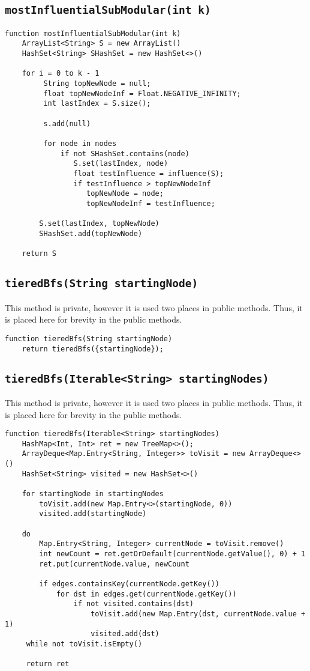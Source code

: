 \documentclass[10pt,letterpaper]{article}
\begin{document}
\subsection{\texttt{mostInfluentialSubModular(int k)}}
\begin{verbatim}
function mostInfluentialSubModular(int k)
    ArrayList<String> S = new ArrayList()
    HashSet<String> SHashSet = new HashSet<>()
    
    for i = 0 to k - 1
         String topNewNode = null;
         float topNewNodeInf = Float.NEGATIVE_INFINITY;
         int lastIndex = S.size();
         
         s.add(null)
         
         for node in nodes
             if not SHashSet.contains(node)
                S.set(lastIndex, node)
                float testInfluence = influence(S);
                if testInfluence > topNewNodeInf
                   topNewNode = node;
                   topNewNodeInf = testInfluence;
        
        S.set(lastIndex, topNewNode)
        SHashSet.add(topNewNode)
       
    return S
\end{verbatim}
\subsection{\texttt{tieredBfs(String startingNode)}}
This method is private, however it is used two places in public methods. Thus,
it is placed here for brevity in the public methods.
\begin{verbatim}
function tieredBfs(String startingNode)
    return tieredBfs({startingNode});
\end{verbatim}
\subsection{\texttt{tieredBfs(Iterable<String> startingNodes)}}
This method is private, however it is used two places in public methods. Thus,
it is placed here for brevity in the public methods.
\begin{verbatim}
function tieredBfs(Iterable<String> startingNodes)
    HashMap<Int, Int> ret = new TreeMap<>();
    ArrayDeque<Map.Entry<String, Integer>> toVisit = new ArrayDeque<>()
    HashSet<String> visited = new HashSet<>()

    for startingNode in startingNodes
        toVisit.add(new Map.Entry<>(startingNode, 0))
        visited.add(startingNode)

    do
        Map.Entry<String, Integer> currentNode = toVisit.remove()
        int newCount = ret.getOrDefault(currentNode.getValue(), 0) + 1
        ret.put(currentNode.value, newCount

        if edges.containsKey(currentNode.getKey())
            for dst in edges.get(currentNode.getKey())
                if not visited.contains(dst)
                    toVisit.add(new Map.Entry(dst, currentNode.value + 1)
                    visited.add(dst)
     while not toVisit.isEmpty()

     return ret
\end{verbatim}
\end{document}
